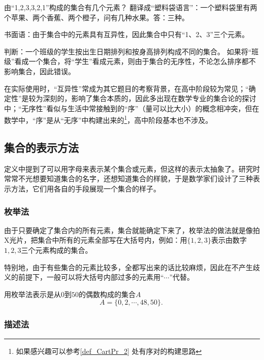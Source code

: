 \begin{example}{由“1,2,3,3,2,1”构成的集合有几个元素？}
翻译成“塑料袋语言”：一个塑料袋里有两个苹果、两个香蕉、两个橙子，问有几种水果。答：三种。

书面语：由于集合中的元素具有互异性，因此集合中只有“1、2、3”三个元素。
\end{example}

\begin{example}{判断：一个班级的学生按出生日期排列和按身高排列构成不同的集合。}
如果将“班级”看成一个集合，将“学生”看成元素，则由于集合的无序性，不论怎么排序都不影响集合，因此错误。
\end{example}

在实际使用时，“互异性”常成为其它题目的考察背景，在高中阶段较为常见；“确定性”是较为深刻的，影响了集合本质的，因此多出现在数学专业的集合论的探讨中；“无序性”看似与生活中常接触到的“序”（量可以比大小）的概念相冲突，但在数学中，“序”是从“无序”中构建出来的\footnote{如果感兴趣可以参考\autoref{def_CartPr_2} 处有序对的构建思路}，高中阶段基本也不涉及。

\subsection{集合的表示方法}

定义中提到了可以用字母来表示某个集合或元素，但这样的表示太抽象了。研究时常常不光想要知道集合的名字，还想知道集合的样貌，于是数学家们设计了三种表示方法，它们用各自的手段展现一个集合的样子。

\subsubsection{枚举法}

由于只要确定了集合内的所有元素，集合就能确定下来了，枚举法的做法就是像拍X光片，把集合中所有的元素全部写在大括号内，例如：用$\{1,2,3\}$表示由数字$1,2,3$三个元素构成的集合。

特别地，由于有些集合的元素比较多，全都写出来的话比较麻烦，因此在不产生歧义的前提下，一般可以将大括号内部过多的元素用“$\cdots$”代替。

\begin{example}{用枚举法表示是从$0$到$50$的偶数构成的集合$A$}
$$A=\{0,2, \cdots ,48,50\}.~$$
\end{example}

\subsubsection{描述法}

